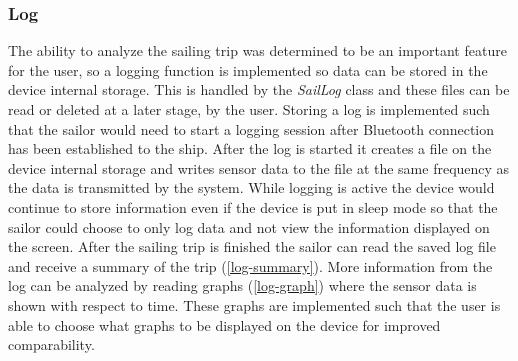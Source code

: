 \subsubsection{Log}
The ability to analyze the sailing trip was determined to be an important feature for the user, so a logging function is implemented so data can be stored in the device internal storage. This is handled by the \emph{SailLog} class and these files can be read or deleted at a later stage, by the user. Storing a log is implemented such that the sailor would need to start a logging session after Bluetooth connection has been established to the ship. After the log is started it creates a file on the device internal storage and writes sensor data to the file at the same frequency as the data is transmitted by the system. While logging is active the device would continue to store information even if the device is put in sleep mode so that the sailor could choose to only log data and not view the information displayed on the screen. After the sailing trip is finished the sailor can read the saved log file and receive a summary of the trip (\autoref{log-summary}). More information from the log can be analyzed by reading graphs (\autoref{log-graph}) where the sensor data is shown with respect to time. These graphs are implemented such that the user is able to choose what graphs to be displayed on the device for improved comparability.
